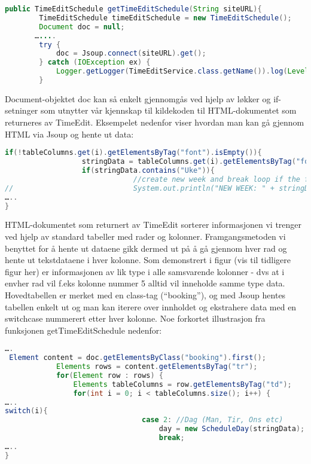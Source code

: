 \documentclass[../main.tex]{subfiles}
\begin{document}
\begin{lstlisting}[language=Java, frame=single, caption={Et utdrag av en metode i TimeEditService som viser hvordan Jsoup benyttes for å hente ut ett enkelt dokument}]
public TimeEditSchedule getTimeEditSchedule(String siteURL){      
        TimeEditSchedule timeEditSchedule = new TimeEditSchedule();
        Document doc = null;
       …....
        try {
            doc = Jsoup.connect(siteURL).get();
        } catch (IOException ex) {
            Logger.getLogger(TimeEditService.class.getName()).log(Level.SEVERE, null, ex);
        }      
\end{lstlisting}

Document-objektet doc kan så enkelt gjennomgås ved hjelp av løkker og if-setninger som utnytter vår kjennskap til kildekoden til HTML-dokumentet som returneres av TimeEdit. Eksempelet nedenfor viser hvordan man kan gå gjennom HTML via Jsoup og hente ut data:

\begin{lstlisting}[language=Java, frame=single, caption={asdasdsadasdasdasdsadsadasdasdsadsa}]
if(!tableColumns.get(i).getElementsByTag("font").isEmpty()){
                  stringData = tableColumns.get(i).getElementsByTag("font").first().text();
                  if(stringData.contains("Uke")){
                              //create new week and break loop if the first element contains Uke
//                            System.out.println("NEW WEEK: " + stringData);
…..
}
\end{lstlisting}

HTML-dokumentet som returnert av TimeEdit sorterer informasjonen vi trenger ved hjelp av standard tabeller med rader og kolonner. Framgangsmetoden vi benyttet for å hente ut dataene gikk dermed ut på å gå gjennom hver rad og hente ut tekstdataene i hver kolonne. Som demonstrert i figur (vis til tidligere figur her) er informasjonen av lik type i alle samsvarende kolonner - dvs at i envher rad vil f.eks kolonne nummer 5 alltid vil inneholde samme type data.
Hovedtabellen er merket med en class-tag (“booking”), og med Jsoup hentes tabellen enkelt ut og man kan iterere over innholdet og ekstrahere data med en switchcase nummerert etter hver kolonne. Noe forkortet illustrasjon fra funksjonen getTimeEditSchedule nedenfor:

\begin{lstlisting}[language=Java, frame=single, caption={asdasdsadasdasdasdsadsadasdasdsadsa}]
….
 Element content = doc.getElementsByClass("booking").first();
            Elements rows = content.getElementsByTag("tr");
            for(Element row : rows) {
                Elements tableColumns = row.getElementsByTag("td");
                for(int i = 0; i < tableColumns.size(); i++) {
…..
switch(i){
                                case 2: //Dag (Man, Tir, Ons etc)
                                    day = new ScheduleDay(stringData);
                                    break;
…..
}
\end{lstlisting}
\end{document}

